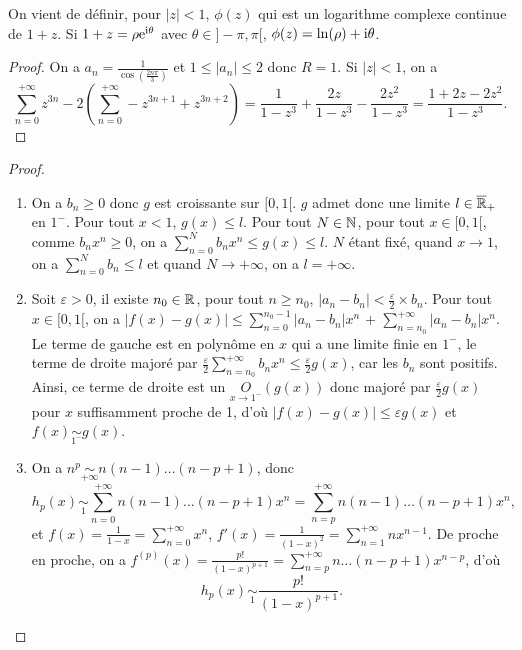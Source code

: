 \documentclass[12pt]{article}
\begin{document}
\begin{remark}
    On vient de définir, pour $\left\lvert z\right\rvert<1$, $\phi(z)$ qui est un logarithme complexe continue de $1+z$. Si $1+z=\rho\mathrm{e}^{\mathrm{i}\theta}$ avec $\theta\in]-\pi,\pi[$, $\phi(z)=\ln(\rho)+\mathrm{i}\theta$.
\end{remark}

\begin{proof}
    On a $a_n=\frac{1}{\cos\left(\frac{2n\pi}{3}\right)}$ et $1\leqslant\left\lvert a_n\right\rvert\leqslant2$ donc $R=1$. Si $\left\lvert z\right\rvert<1$, on a 
    \begin{equation}
        \sum_{n=0}^{+\infty}z^{3n}-2\left(\sum_{n=0}^{+\infty}-z^{3n+1}+z^{3n+2}\right)=\frac{1}{1-z^{3}}+\frac{2z}{1-z^{3}}-\frac{2z^{2}}{1-z^{3}}=\frac{1+2z-2z^{2}}{1-z^{3}}.
    \end{equation}
\end{proof}

\begin{proof}
    \phantom{}
    \begin{enumerate}
        \item On a $b_n\geqslant0$ donc $g$ est croissante sur $[0,1[$. $g$ admet donc une limite $l\in\overline{\mathbb{R}}_{+}$ en $1^{-}$. Pour tout $x<1$, $g(x)\leqslant l$. Pour tout $N\in\mathbb{N}$, pour tout $x\in[0,1[$, comme $b_nx^{n}\geqslant0$, on a $\sum_{n=0}^{N}b_{n}x^{n}\leqslant g(x)\leqslant l$. $N$ étant fixé, quand $x\to1$, on a $\sum_{n=0}^{N}b_n\leqslant l$ et quand $N\to+\infty$, on a $l=+\infty$.
        \item Soit $\varepsilon>0$, il existe $n_0\in\mathbb{R}$, pour tout $n\geqslant n_0$, $\left\lvert a_n-b_n\right\rvert<\frac{\varepsilon}{2}\times b_n$. Pour tout $x\in[0,1[$, on a $\left\lvert f(x)-g(x)\right\rvert\leqslant\sum_{n=0}^{n_{0}-1}\left\lvert a_n-b_n\right\rvert x^{n}$ + $\sum_{n=n_0}^{+\infty}\left\lvert a_n-b_n\right\rvert x^{n}$. Le terme de gauche est en polynôme en $x$ qui a une limite finie en $1^{-}$, le terme de droite majoré par $\frac{\varepsilon}{2}\sum_{n=n_0}^{+\infty}b_nx^{n}\leqslant\frac{\varepsilon}{2}g(x)$, car les $b_n$ sont positifs. Ainsi, ce terme de droite est un $\underset{x\to1^{-}}{O}(g(x))$ donc majoré par $\frac{\varepsilon}{2}g(x)$ pour $x$ suffisamment proche de 1, d'où $\left\lvert f(x)-g(x)\right\rvert\leqslant\varepsilon g(x)$ et $f(x)\underset{1^{-}}{\sim}g(x)$.
        \item On a $n^{p}\underset{+\infty}{\sim}n(n-1)\dots(n-p+1)$, donc 
        \begin{equation}
            h_p(x)\underset{1}{\sim}\sum_{n=0}^{+\infty}n(n-1)\dots(n-p+1)x^{n}=\sum_{n=p}^{+\infty}n(n-1)\dots(n-p+1)x^{n},
        \end{equation}
        et $f(x)=\frac{1}{1-x}=\sum_{n=0}^{+\infty}x^{n}$, $f'(x)=\frac{1}{(1-x)^{2}}=\sum_{n=1}^{+\infty}nx^{n-1}$. De proche en proche, on a $f^{(p)}(x)=\frac{p!}{(1-x)^{p+1}}=\sum_{n=p}^{+\infty}n\dots(n-p+1)x^{n-p}$, d'où 
        \begin{equation}
            \boxed{
                h_p(x)\underset{1}{\sim}\frac{p!}{(1-x)^{p+1}}.
            }
        \end{equation}
    \end{enumerate}
\end{proof}
\end{document}

